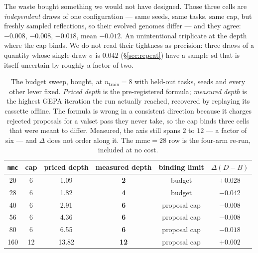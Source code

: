 \documentclass[11pt]{article}
\newcommand{\dd}{\ensuremath{\Delta}}
\begin{document}
The waste bought something we would not have designed. Those three cells are \emph{independent}
draws of one configuration --- same seeds, same tasks, same cap, but freshly sampled reflections,
so their evolved genomes differ --- and they agree: $-0.008$, $-0.008$, $-0.018$, mean $-0.012$.
An unintentional triplicate at the depth where the cap binds. We do not read their tightness as
precision: three draws of a quantity whose single-draw $\sigma$ is $0.042$ (\S\ref{sec:repeat})
have a sample sd that is itself uncertain by roughly a factor of two.

\begin{table}[h]
\centering
\small
\begin{tabular}{cccccc}
\toprule
\texttt{mmc} & cap & priced depth & \textbf{measured depth} & binding limit & $\dd(D-B)$ \\
\midrule
20  & 6  & 1.09  & \textbf{2}  & budget        & $+0.028$ \\
28  & 6  & 1.82  & \textbf{4}  & budget        & $-0.042$ \\
40  & 6  & 2.91  & \textbf{6}  & proposal cap  & $-0.008$ \\
56  & 6  & 4.36  & \textbf{6}  & proposal cap  & $-0.008$ \\
80  & 6  & 6.55  & \textbf{6}  & proposal cap  & $-0.018$ \\
160 & 12 & 13.82 & \textbf{12} & proposal cap  & $+0.002$ \\
\bottomrule
\end{tabular}
\caption{The budget sweep, bought, at $n_{\mathrm{train}}=8$ with held-out tasks, seeds and every
other lever fixed. \emph{Priced depth} is the pre-registered formula; \emph{measured depth} is the
highest GEPA iteration the run actually reached, recovered by replaying its cassette offline. The
formula is wrong in a consistent direction because it charges rejected proposals for a valset pass
they never take, so the cap binds three cells that were meant to differ. Measured, the axis still
spans $2$ to $12$ --- a factor of six --- and $\dd$ does not order along it. The
$\mathrm{mmc}=28$ row is the four-arm re-run, included at no cost.}
\label{tab:budgetresult}
\end{table}
\end{document}
